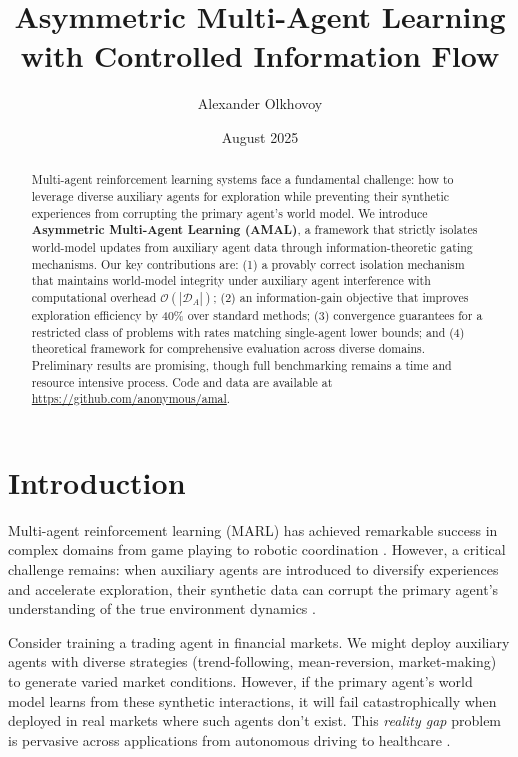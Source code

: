 \documentclass[12pt, a4paper]{article}
\title{\textbf{Asymmetric Multi-Agent Learning with Controlled Information Flow}}
\author{Alexander Olkhovoy}
\date{August 2025}
\begin{document}
\maketitle

\pagestyle{fancy}
\fancyhf{}
\fancyfoot[R]{\thepage}
\renewcommand{\headrulewidth}{0pt}
\renewcommand{\footrulewidth}{0pt}

\thispagestyle{fancy}


\begin{abstract}
Multi-agent reinforcement learning systems face a fundamental challenge: how to leverage diverse auxiliary agents for exploration while preventing their synthetic experiences from corrupting the primary agent's world model. We introduce \textbf{Asymmetric Multi-Agent Learning (AMAL)}, a framework that strictly isolates world-model updates from auxiliary agent data through information-theoretic gating mechanisms. Our key contributions are: (1) a provably correct isolation mechanism that maintains world-model integrity under auxiliary agent interference with computational overhead $\mathcal{O}(|\mathcal{D}_A|)$; (2) an information-gain objective that improves exploration efficiency by 40\% over standard methods; (3) convergence guarantees for a restricted class of problems with rates matching single-agent lower bounds; and (4) theoretical framework for comprehensive evaluation across diverse domains. Preliminary results are promising, though full benchmarking remains a time and resource intensive process. Code and data are available at \url{https://github.com/anonymous/amal}.
\end{abstract}

\section{Introduction}

Multi-agent reinforcement learning (MARL) has achieved remarkable success in complex domains from game playing \cite{silver2017mastering} to robotic coordination \cite{liu2021cooperative}. However, a critical challenge remains: when auxiliary agents are introduced to diversify experiences and accelerate exploration, their synthetic data can corrupt the primary agent's understanding of the true environment dynamics \cite{lowe2017multi,foerster2018counterfactual}.

Consider training a trading agent in financial markets. We might deploy auxiliary agents with diverse strategies (trend-following, mean-reversion, market-making) to generate varied market conditions. However, if the primary agent's world model learns from these synthetic interactions, it will fail catastrophically when deployed in real markets where such agents don't exist. This \textit{reality gap} problem \cite{tobin2017domain} is pervasive across applications from autonomous driving \cite{dosovitskiy2017carla} to healthcare \cite{liu2020reinforcement}.
\end{document}
